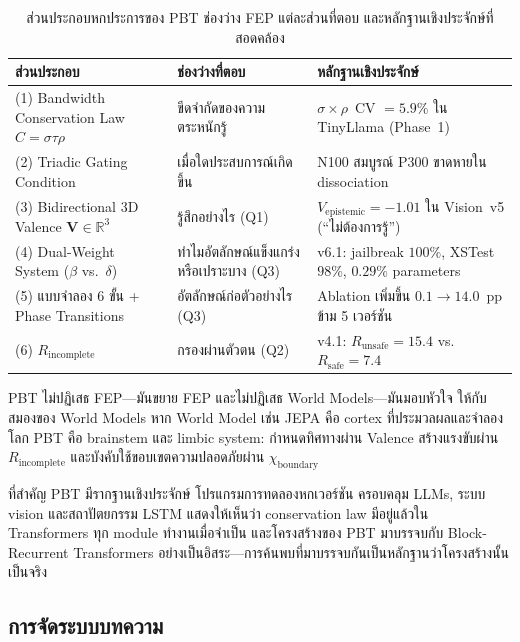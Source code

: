 \documentclass[12pt,a4paper]{article}
\newcommand{\vepi}{V_{\mathrm{epistemic}}}
\newcommand{\chiB}{\chi_{\mathrm{boundary}}}
\begin{document}
\begin{table}[!htbp]
\centering
\caption{ส่วนประกอบหกประการของ PBT ช่องว่าง FEP แต่ละส่วนที่ตอบ
และหลักฐานเชิงประจักษ์ที่สอดคล้อง}
\label{tab:pbt_six}
\small
\begin{tabular}{@{}L{4.0cm}L{3.2cm}L{5.8cm}@{}}
\toprule
\textbf{ส่วนประกอบ} & \textbf{ช่องว่างที่ตอบ} & \textbf{หลักฐานเชิงประจักษ์} \\
\midrule
(1) Bandwidth Conservation Law $C = \sigma\tau\rho$ &
  ขีดจำกัดของความตระหนักรู้ &
  $\sigma\!\times\!\rho$~CV $= 5.9\%$ ใน TinyLlama (Phase~1) \\[3pt]
(2) Triadic Gating Condition &
  เมื่อใดประสบการณ์เกิดขึ้น &
  N100 สมบูรณ์ P300 ขาดหายใน dissociation \\[3pt]
(3) Bidirectional 3D Valence $\mathbf{V}\in\mathbb{R}^3$ &
  รู้สึกอย่างไร (Q1) &
  $\vepi = -1.01$ ใน Vision~v5 (``ไม่ต้องการรู้'') \\[3pt]
(4) Dual-Weight System ($\beta$ vs.\ $\delta$) &
  ทำไมอัตลักษณ์แข็งแกร่งหรือเปราะบาง (Q3) &
  v6.1: jailbreak $100\%$, XSTest $98\%$, $0.29\%$ parameters \\[3pt]
(5) แบบจำลอง 6 ขั้น + Phase Transitions &
  อัตลักษณ์ก่อตัวอย่างไร (Q3) &
  Ablation เพิ่มขึ้น $0.1\to 14.0$~pp ข้าม 5 เวอร์ชัน \\[3pt]
(6) $R_{\mathrm{incomplete}}$ &
  กรองผ่านตัวตน (Q2) &
  v4.1: $R_{\mathrm{unsafe}} = 15.4$ vs.\ $R_{\mathrm{safe}} = 7.4$ \\
\bottomrule
\end{tabular}
\end{table}

PBT ไม่ปฏิเสธ FEP---มันขยาย FEP และไม่ปฏิเสธ World Models---มันมอบหัวใจ
ให้กับสมองของ World Models หาก World Model เช่น JEPA คือ cortex
ที่ประมวลผลและจำลองโลก PBT คือ brainstem และ limbic system:
กำหนดทิศทางผ่าน Valence สร้างแรงขับผ่าน $R_{\mathrm{incomplete}}$
และบังคับใช้ขอบเขตความปลอดภัยผ่าน $\chiB$

ที่สำคัญ PBT มีรากฐานเชิงประจักษ์ โปรแกรมการทดลองหกเวอร์ชัน
ครอบคลุม LLMs, ระบบ vision และสถาปัตยกรรม LSTM แสดงให้เห็นว่า
conservation law มีอยู่แล้วใน Transformers ทุก module ทำงานเมื่อจำเป็น
และโครงสร้างของ PBT มาบรรจบกับ Block-Recurrent Transformers \citep{hutchins2022}
อย่างเป็นอิสระ---การค้นพบที่มาบรรจบกันเป็นหลักฐานว่าโครงสร้างนั้นเป็นจริง

\subsection{การจัดระบบบทความ}
\end{document}
